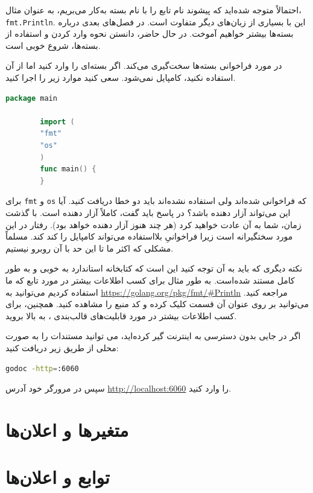 \documentclass{book}
\begin{document}
احتمالاً متوجه شده‌اید که پیشوند نام تابع را با نام بسته به‌کار می‌بریم، به عنوان مثال، \verb*|fmt.Println|. این با بسیاری از زبان‌های دیگر متفاوت است. در فصل‌های بعدی درباره بسته‌ها بیشتر خواهیم آموخت. در حال حاضر، دانستن نحوه وارد کردن و استفاده از بسته‌ها، شروع خوبی است.

در مورد فراخوانی بسته‌ها سخت‌گیری می‌کند. اگر بسته‌ای را وارد کنید اما از آن استفاده نکنید، کامپایل نمی‌شود. سعی کنید موارد زیر را اجرا کنید.

\begin{latin}
	\begin{lstlisting}[language=Go]
		package main
		
		import (
		"fmt"
		"os"
		)
		func main() {
		}
	\end{lstlisting}
\end{latin}
برای \verb*|fmt| و \verb*|os| که فراخوانی شده‌اند ولی استفاده نشده‌اند باید دو خطا دریافت کنید. آیا این می‌تواند آزار دهنده باشد؟ در  پاسخ باید گفت، کاملاً  آزار دهنده است. با گذشت زمان، شما به آن عادت خواهید کرد (هر چند هنوز آزار دهنده خواهد بود).
رفتار  
 در این مورد سختگیرانه است زیرا فراخوانیِ بلااستفاده می‌تواند کامپایل را کند کند. مسلماً مشکلی که اکثر ما تا این حد با آن روبرو نیستیم. 
 
 نکته دیگری که باید به آن توجه کنید این است که کتابخانه استاندارد  به خوبی و به طور کامل مستند شده‌است. به طور مثال برای کسب اطلاعات بیشتر در مورد تابع  که ما استفاده کردیم می‌توانید به \url{https://golang.org/pkg/fmt/#Println} مراجعه کنید. می‌توانید بر روی عنوان آن قسمت کلیک کرده و کد منبع را مشاهده کنید. همچنین، برای کسب اطلاعات بیشتر در مورد قابلیت‌های قالب‌بندی ، به بالا بروید.
 
اگر در جایی بدون دسترسی به اینترنت گیر کرده‌اید، می توانید مستندات را به صورت محلی از طریق زیر دریافت کنید:
\begin{latin}
	\begin{lstlisting}[language=bash]
	godoc -http=:6060
	\end{lstlisting}
\end{latin}
سپس در مرورگر خود آدرس  \url{http://localhost:6060} را وارد کنید.
 
\newpage
\section{متغیرها و اعلان‌ها}

\newpage
\section{توابع و اعلان‌ها}
\end{document}
